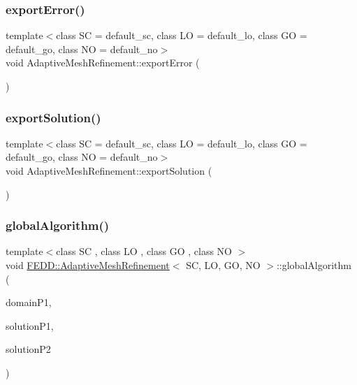 \subsubsection{\texorpdfstring{export\+Error()}{exportError()}}
{\footnotesize\ttfamily template$<$class SC  = default\+\_\+sc, class LO  = default\+\_\+lo, class GO  = default\+\_\+go, class NO  = default\+\_\+no$>$ \\
void Adaptive\+Mesh\+Refinement\+::export\+Error (\begin{DoxyParamCaption}{ }\end{DoxyParamCaption})}

\mbox{\label{classFEDD_1_1AdaptiveMeshRefinement_a3e2a80f6e9caad8507b0d1afb0537e53}} 
\subsubsection{\texorpdfstring{export\+Solution()}{exportSolution()}}
{\footnotesize\ttfamily template$<$class SC  = default\+\_\+sc, class LO  = default\+\_\+lo, class GO  = default\+\_\+go, class NO  = default\+\_\+no$>$ \\
void Adaptive\+Mesh\+Refinement\+::export\+Solution (\begin{DoxyParamCaption}{ }\end{DoxyParamCaption})}

\mbox{\label{classFEDD_1_1AdaptiveMeshRefinement_af882598ec6c8af6d1d755b088b324db1}} 
\subsubsection{\texorpdfstring{global\+Algorithm()}{globalAlgorithm()}}
{\footnotesize\ttfamily template$<$class SC , class LO , class GO , class NO $>$ \\
void \hyperlink{classFEDD_1_1AdaptiveMeshRefinement}{F\+E\+D\+D\+::\+Adaptive\+Mesh\+Refinement}$<$ SC, LO, GO, NO $>$\+::global\+Algorithm (\begin{DoxyParamCaption}\item[{Domain\+Ptr\+\_\+\+Type}]{domain\+P1,  }\item[{Domain\+Ptr\+\_\+\+Type domain\+P2 \hyperlink{classFEDD_1_1AdaptiveMeshRefinement_af4fb11adbdf1bba9bcaf8952324d32f2}{Multi\+Vector\+Ptr\+\_\+\+Type}}]{solution\+P1,  }\item[{\hyperlink{classFEDD_1_1AdaptiveMeshRefinement_af4fb11adbdf1bba9bcaf8952324d32f2}{Multi\+Vector\+Ptr\+\_\+\+Type}}]{solution\+P2 }\end{DoxyParamCaption})}



